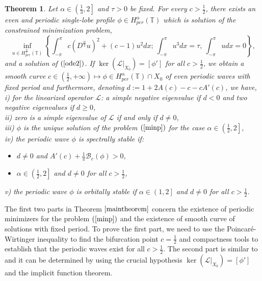\documentclass[12pt,reqno]{amsart}
\newcommand{\2}{L^2_{per}(0, T)}
\newcommand{\Hper}{{H_{per}^{\frac{\alpha}{2}}(\mathbb{T})}}
\numberwithin{equation}{section}
\numberwithin{figure}{section}
\newtheorem{theorem}{Theorem}[section]
\begin{document}
\begin{theorem}\label{maintheorem}
Let $\alpha\in\left(\frac{1}{3},2\right]$ and $\tau>0$ be fixed. For every $c>\frac{1}{2}$, there exists an even and periodic single-lobe profile $\phi\in H_{per}^{\alpha}(\mathbb{T})$ which is solution of the constrained minimization problem,
\begin{equation}\label{minp}
	\inf_{u\in \Hper}\left\{\int_{-\pi}^{\pi}c(D^{\frac{\alpha}{2}}u)^2+(c-1)u^2dx;\ \int_{-\pi}^{\pi}u^3dx=\tau,\ \int_{-\pi}^{\pi}udx=0\right\},
\end{equation}
and a solution of $(\ref{ode2})$. If $\ker\left(\mathcal{L}|_{X_0}\right)=[\phi']$ for all $c>\frac{1}{2}$, we obtain a smooth curve $c\in\left(\frac{1}{2},+\infty\right)\mapsto\phi\in H_{per}^{\alpha}(\mathbb{T})\cap X_0$ of even periodic waves with fixed period and furthermore, denoting $d:=1+2A(c)-c-cA'(c)$, we have,\\

\noindent i) for the linearized operator $\mathcal{L}$: a simple negative eigenvalue if $d<0$ and two negative eigenvalues if $d\geq0$,\\
ii) zero is a simple eigenvalue of $\mathcal{L}$ if and only if $d\neq0$, \\
iii) $\phi$ is the unique solution of the problem $(\ref{minp})$ for the case $\alpha\in\left(\frac{1}{2},2\right],$\\
iv) the periodic wave $\phi$ is spectrally stable if:
\begin{itemize}
	\item $d\neq0$ and $A'(c)+ \frac{1}{\pi}\mathcal{B}_c(\phi)>0$,
	\item $\alpha\in\left(\frac{1}{2},2\right]$ and $d\neq0$ for all $c>\frac{1}{2}$,
\end{itemize}
v) the periodic wave $\phi$ is orbitally stable if $\alpha\in\left(1,2\right]$ and $d\neq0$ for all $c>\frac{1}{2}$.

\end{theorem}
\indent The first two parts in Theorem $\ref{maintheorem}$ concern the existence of periodic minimizers for the problem $(\ref{minp})$ and the existence of smooth curve of solutions with fixed period. To prove the first part, we need to use the Poincar\'e-Wirtinger inequality to find the bifurcation point $c=\frac{1}{2}$ and compactness tools to establish that the periodic waves exist for all $c>\frac{1}{2}$. The second part is similar to \cite[Lemma 3.8]{NPL} and it can be determined by using the crucial hypothesis $\ker\left(\mathcal{L}|_{X_0}\right)=[\phi']$ and the implicit function theorem.\\
\end{document}
